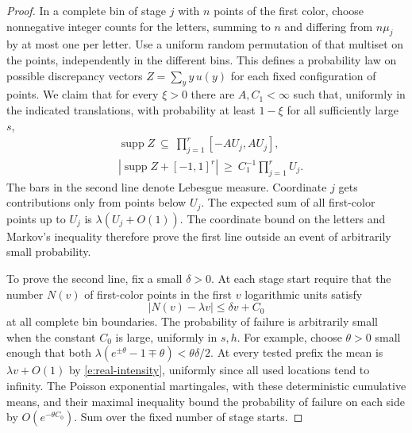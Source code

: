\documentclass[11pt]{article}
\numberwithin{equation}{section}
\begin{document}
\begin{proof}
In a complete bin of stage $j$ with $n$ points of the first color,
choose nonnegative integer counts for the letters, summing to $n$
and differing from $n\mu_j$ by at most one per letter. Use a uniform
random permutation of that multiset on the points, independently in
the different bins. This defines a probability law on possible
discrepancy vectors $Z=\sum_y y\,u(y)$ for each fixed configuration
of points. We claim that for every $\xi>0$ there
are $A,C_1<\infty$ such that, uniformly in the indicated translations,
with probability at least $1-\xi$ for all sufficiently large $s$,
\begin{align}
 &\operatorname{supp} Z\ \subseteq\ \prod_{j=1}^r[-A U_j,A U_j],
       \nonumber\\
 &\left|\operatorname{supp} Z+[-1,1]^r\right|
          \ \ge\ C_1^{-1}\prod_{j=1}^r U_j .                   \label{e:real-volume}
\end{align}
The bars in the second line denote Lebesgue measure. Coordinate $j$
gets contributions only from points below $U_j$. The expected sum of
all first-color points up to $U_j$ is $\lambda(U_j+O(1))$. The coordinate
bound on the letters and Markov's inequality therefore prove the
first line outside an event of arbitrarily small probability.

To prove the second line, fix a small $\delta>0$. At each stage start
require that the number $N(v)$ of first-color points in the first $v$
logarithmic units satisfy
\begin{equation}
              |N(v)-\lambda v|\le\delta v+C_0                 \label{e:real-count}
\end{equation}
at all complete bin boundaries. The probability of failure is
arbitrarily small when the constant $C_0$ is large, uniformly in
$s,h$. For example, choose $\theta>0$ small enough that both
$\lambda(e^{\pm\theta}-1\mp\theta)<\theta\delta/2$. At every tested
prefix the mean is $\lambda v+O(1)$ by \eqref{e:real-intensity},
uniformly since all used locations tend to infinity. The Poisson
exponential martingales, with these deterministic cumulative means,
and their maximal inequality bound the probability of failure on
each side by $O(e^{-\theta C_0})$. Sum over the fixed number of stage starts.


\end{proof}
\end{document}
